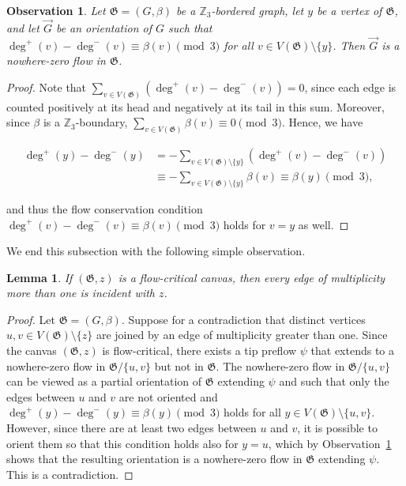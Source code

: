 \documentclass{article}
\newcommand{\Z}{\mathbb{Z}_3}
\newcommand\g{\mathfrak{G}}
\newtheorem{observation}[theorem]{Observation}
\newtheorem{lemma}[theorem]{Lemma}
\begin{document}
\begin{observation}\label{obs-allbutone}
Let $\g=(G,\beta)$ be a $\Z$-bordered graph, let $y$ be a vertex of $\g$, and let $\vec{G}$ be an orientation of $G$ such that $\deg^+(v) -\deg^-(v) \equiv \beta(v)\pmod 3$ for all
$v\in V(\g)\setminus\{y\}$.  Then $\vec{G}$ is a nowhere-zero flow in $\g$.
\end{observation}
\begin{proof}
Note that $\sum_{v\in V(\g)} (\deg^+(v) -\deg^-(v))=0$, since each edge is counted positively at its head and negatively at its tail in this sum.
Moreover, since $\beta$ is a $\Z$-boundary, $\sum_{v\in V(\g)} \beta(v)\equiv 0\pmod 3$.
Hence, we have

\begin{align*}
    \deg^+(y)-\deg^-(y)&=-\sum_{v\in V(\g)\setminus\{y\}} (\deg^+(v) -\deg^-(v)) \\&\equiv -\sum_{v\in V(\g)\setminus\{y\}}\beta(v)\equiv \beta(y)\pmod 3,
\end{align*}

and thus the flow conservation condition $\deg^+(v) -\deg^-(v) \equiv \beta(v)\pmod 3$ holds for $v=y$ as well.
\end{proof}

We end this subsection with the following simple observation.

\begin{lemma}\label{lemma-simple}
If $(\g,z)$ is a flow-critical canvas, then every edge of multiplicity more than one is incident with $z$.
\end{lemma}
\begin{proof}
Let $\g=(G,\beta)$.
Suppose for a contradiction that distinct vertices $u,v\in V(\g)\setminus\{z\}$ are joined by an edge of multiplicity greater than one.
Since the canvas $(\g,z)$ is flow-critical, there exists a tip preflow $\psi$ that extends to a nowhere-zero flow in $\g/\{u,v\}$ but not in $\g$.
The nowhere-zero flow in $\g/\{u,v\}$ can be viewed as a partial orientation of $\g$ extending $\psi$ and such that only the edges
between $u$ and $v$ are not oriented and $\deg^+(y)-\deg^-(y)\equiv \beta(y)\pmod 3$ holds for all $y\in V(\g)\setminus\{u,v\}$.
However, since there are at least two edges between $u$ and $v$, it is possible to orient them so that this condition
holds also for $y=u$, which by Observation~\ref{obs-allbutone} shows that the resulting orientation is a nowhere-zero flow in $\g$ extending $\psi$. This is a contradiction.
\end{proof}
\end{document}
